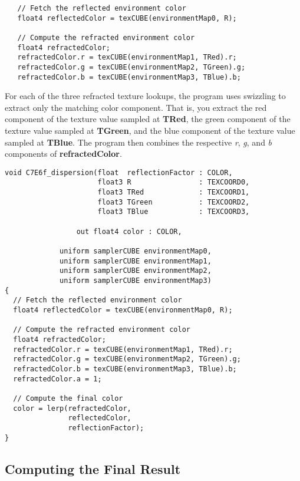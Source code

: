 \documentclass[../main.tex]{subfiles}
\begin{document}
\FloatBarrier
\begin{lstlisting}
   // Fetch the reflected environment color
   float4 reflectedColor = texCUBE(environmentMap0, R);

   // Compute the refracted environment color
   float4 refractedColor;
   refractedColor.r = texCUBE(environmentMap1, TRed).r;
   refractedColor.g = texCUBE(environmentMap2, TGreen).g;
   refractedColor.b = texCUBE(environmentMap3, TBlue).b;
\end{lstlisting}
\FloatBarrier

For each of the three refracted texture lookups, the program uses swizzling to extract only the matching color component. That is, you extract the red component of the texture value sampled at \textbf{TRed}, the green component of the texture value sampled at \textbf{TGreen}, and the blue component of the texture value sampled at \textbf{TBlue}. The program then combines the respective \textit{r}, \textit{g}, and \textit{b} components of \textbf{refractedColor}.

\FloatBarrier
\begin{lstlisting}[caption=Example 7-6. The \textbf{C7E6f_dispersion} Fragment Program]
void C7E6f_dispersion(float  reflectionFactor : COLOR,
                      float3 R                : TEXCOORD0,
                      float3 TRed             : TEXCOORD1,
                      float3 TGreen           : TEXCOORD2,
                      float3 TBlue            : TEXCOORD3,

                 out float4 color : COLOR,

             uniform samplerCUBE environmentMap0,
             uniform samplerCUBE environmentMap1,
             uniform samplerCUBE environmentMap2,
             uniform samplerCUBE environmentMap3)
{
  // Fetch the reflected environment color
  float4 reflectedColor = texCUBE(environmentMap0, R);

  // Compute the refracted environment color
  float4 refractedColor;
  refractedColor.r = texCUBE(environmentMap1, TRed).r;
  refractedColor.g = texCUBE(environmentMap2, TGreen).g;
  refractedColor.b = texCUBE(environmentMap3, TBlue).b;
  refractedColor.a = 1;

  // Compute the final color
  color = lerp(refractedColor,
               reflectedColor,
               reflectionFactor);
}
\end{lstlisting}
\FloatBarrier

\subsection*{Computing the Final Result}
\end{document}
